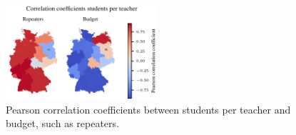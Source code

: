 \begin{figure}[h]
    \centering
    \includegraphics[width=0.5\textwidth]{fig/fig_heatmap_correlation_students_per_teacher_repeaters_budget.pdf}
    \caption{Pearson correlation coefficients between students per teacher and budget, such as repeaters.}
    \label{fig:heatmap_correlation_students_per_teacher_repeaters_budget}
\end{figure}